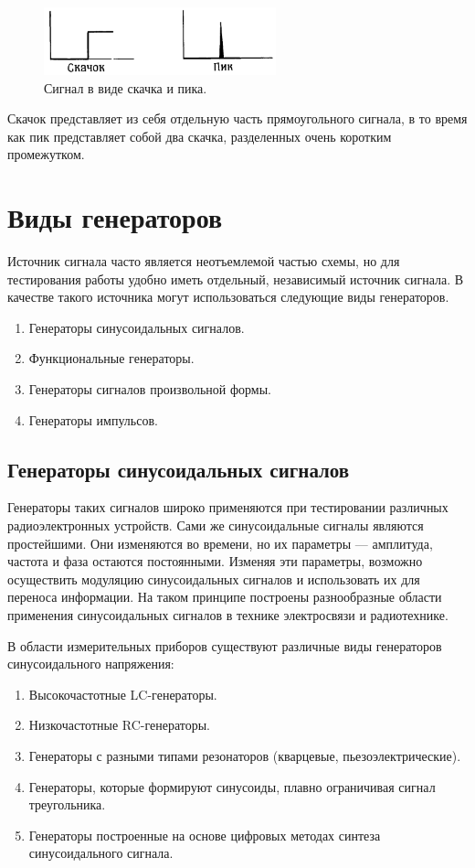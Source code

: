 	\begin{figure}[H]
    \centering
    \includegraphics[width=0.6\textwidth]{../image/s_sp.png}
    \caption{Сигнал в виде скачка и пика.}
	\end{figure}

	Скачок представляет из себя отдельную часть прямоугольного сигнала, в то время как пик представляет собой два скачка, разделенных очень коротким промежутком.


\section{Виды генераторов}
	Источник сигнала часто является неотъемлемой частью схемы, но для тестирования работы удобно иметь отдельный, независимый источник сигнала. В качестве такого источника могут использоваться следующие виды генераторов.
\begin{enumerate}
	\item Генераторы синусоидальных сигналов.
	\item Функциональные генераторы.
	\item Генераторы сигналов произвольной формы.
	\item Генераторы импульсов.
\end{enumerate}

\subsection{Генераторы синусоидальных сигналов}
	Генераторы таких сигналов широко применяются при тестировании различных радиоэлектронных устройств. Сами же синусоидальные сигналы являются простейшими. Они изменяются во времени, но их параметры --- амплитуда, частота и фаза остаются постоянными. Изменяя эти параметры, возможно осуществить модуляцию синусоидальных сигналов и использовать их для переноса информации. На таком принципе построены разнообразные области применения синусоидальных сигналов в технике электросвязи и радиотехнике.

	В области измерительных приборов существуют различные виды генераторов синусоидального напряжения:

\begin{enumerate}
	\item Высокочастотные LC-генераторы.
	\item Низкочастотные RC-генераторы.
	\item Генераторы с разными типами резонаторов (кварцевые, пьезоэлектрические).
	\item Генераторы, которые формируют синусоиды, плавно ограничивая сигнал треугольника.
	\item Генераторы построенные на основе цифровых методах синтеза синусоидального сигнала.
\end{enumerate}

